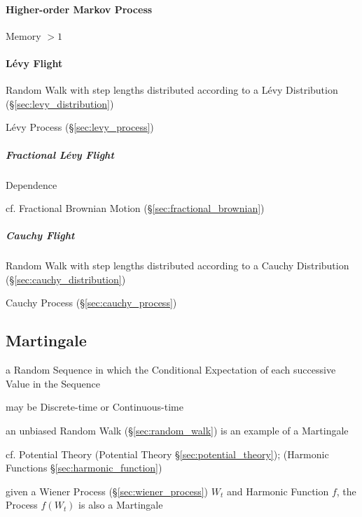 \paragraph{Higher-order Markov Process}\label{sec:higher_order_markov}\hfill

Memory $>1$



\paragraph{L\'evy Flight}\label{sec:levy_flight}\hfill

Random Walk with step lengths distributed according to a L\'evy Distribution
(\S\ref{sec:levy_distribution})

\fist L\'evy Process (\S\ref{sec:levy_process})



\subparagraph{Fractional L\'evy Flight}\label{sec:fractional_levy}\hfill

Dependence

\fist cf. Fractional Brownian Motion (\S\ref{sec:fractional_brownian})



\subparagraph{Cauchy Flight}\label{sec:cauchy_flight}\hfill

Random Walk with step lengths distributed according to a Cauchy Distribution
(\S\ref{sec:cauchy_distribution})

\fist Cauchy Process (\S\ref{sec:cauchy_process})



\subsection{Martingale}\label{sec:martingale}

a Random Sequence in which the Conditional Expectation of each successive Value
in the Sequence

may be Discrete-time or Continuous-time

an unbiased Random Walk (\S\ref{sec:random_walk}) is an example of a Martingale

\fist cf. Potential Theory (Potential Theory \S\ref{sec:potential_theory});
(Harmonic Functions \S\ref{sec:harmonic_function})

given a Wiener Process (\S\ref{sec:wiener_process}) $W_t$ and Harmonic Function
$f$, the Process $f(W_t)$ is also a Martingale



